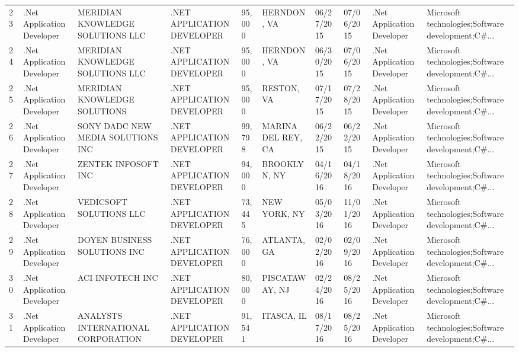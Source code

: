 \begin{table}[h!]
{\begin{tabular}{llllllllll}
	23 &  .Net Application Developer &                   MERIDIAN KNOWLEDGE SOLUTIONS LLC &  .NET APPLICATION DEVELOPER &      95,000 &         HERNDON, VA &  06/27/2015 &  07/06/2015 &  .Net Application Developer &  Microsoft technologies;Software development;C\#... \\
	24 &  .Net Application Developer &                   MERIDIAN KNOWLEDGE SOLUTIONS LLC &  .NET APPLICATION DEVELOPER &      95,000 &         HERNDON, VA &  06/30/2015 &  07/06/2015 &  .Net Application Developer &  Microsoft technologies;Software development;C\#... \\
	25 &  .Net Application Developer &                       MERIDIAN KNOWLEDGE SOLUTIONS &  .NET APPLICATION DEVELOPER &      95,000 &          RESTON, VA &  07/17/2015 &  07/28/2015 &  .Net Application Developer &  Microsoft technologies;Software development;C\#... \\
	26 &  .Net Application Developer &                  SONY DADC NEW MEDIA SOLUTIONS INC &  .NET APPLICATION DEVELOPER &      99,798 &  MARINA DEL REY, CA &  06/22/2015 &  06/22/2015 &  .Net Application Developer &  Microsoft technologies;Software development;C\#... \\
	27 &  .Net Application Developer &                                ZENTEK INFOSOFT INC &  .NET APPLICATION DEVELOPER &      94,000 &        BROOKLYN, NY &  04/16/2016 &  04/18/2016 &  .Net Application Developer &  Microsoft technologies;Software development;C\#... \\
	28 &  .Net Application Developer &                            VEDICSOFT SOLUTIONS LLC &  .NET APPLICATION DEVELOPER &      73,445 &        NEW YORK, NY &  05/03/2016 &  11/01/2016 &  .Net Application Developer &  Microsoft technologies;Software development;C\#... \\
	29 &  .Net Application Developer &                       DOYEN BUSINESS SOLUTIONS INC &  .NET APPLICATION DEVELOPER &      76,000 &         ATLANTA, GA &  02/02/2016 &  02/09/2016 &  .Net Application Developer &  Microsoft technologies;Software development;C\#... \\
	30 &  .Net Application Developer &                                   ACI INFOTECH INC &  .NET APPLICATION DEVELOPER &      80,000 &      PISCATAWAY, NJ &  02/24/2016 &  08/25/2016 &  .Net Application Developer &  Microsoft technologies;Software development;C\#... \\
	31 &  .Net Application Developer &                 ANALYSTS INTERNATIONAL CORPORATION &  .NET APPLICATION DEVELOPER &      91,541 &          ITASCA, IL &  08/17/2016 &  08/25/2016 &  .Net Application Developer &  Microsoft technologies;Software development;C\#... \\

\end{tabular}}
\end{table}
